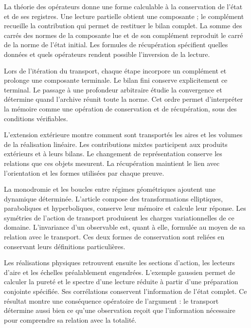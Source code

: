 
La théorie des opérateurs donne une forme calculable à la conservation de l'état et de ses registres. Une lecture partielle obtient une composante ; le complément recueille la contribution qui permet de restituer le bilan complet. La somme des carrés des normes de la composante lue et de son complément reproduit le carré de la norme de l'état initial. Les formules de récupération spécifient quelles données et quels opérateurs rendent possible l'inversion de la lecture.

Lors de l’itération du transport, chaque étape incorpore un complément et
prolonge une composante terminale. Le bilan fini conserve
explicitement ce terminal. Le passage à une profondeur arbitraire
étudie la convergence et détermine quand l’archive réunit toute la
norme. Cet ordre permet d’interpréter la mémoire comme une opération
de conservation et de récupération, sous des conditions vérifiables.

L’extension extérieure montre comment sont transportés les aires et les volumes
de la réalisation linéaire. Les contributions mixtes participent aux
produits extérieurs et à leurs bilans. Le changement de
représentation conserve les relations que ces objets mesurent.
La récupération maintient le lien avec l’orientation et les formes
utilisées par chaque preuve.

La monodromie et les boucles entre régimes géométriques ajoutent une dynamique déterminée. L'article compose des transformations elliptiques, paraboliques et hyperboliques, conserve leur mémoire et calcule leur réponse. Les symétries de l'action de transport produisent les charges variationnelles de ce domaine. L'invariance d'un observable est, quant à elle, formulée au moyen de sa relation avec le transport. Ces deux formes de conservation sont reliées en conservant leurs définitions particulières.

Les réalisations physiques retrouvent ensuite les sections d’action,
les lecteurs d’aire et les échelles préalablement engendrées. L’exemple
gaussien permet de calculer la pureté et le spectre d’une lecture
réduite à partir d’une préparation conjointe spécifiée. Ses
corrélations conservent l’information de l’état complet. Ce
résultat montre une conséquence opératoire de l’argument : le
transport détermine aussi bien ce qu’une observation reçoit que
l’information nécessaire pour comprendre sa relation avec la totalité.
